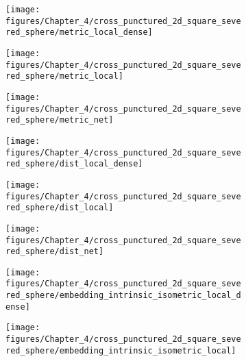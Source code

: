 	\begin{figure}[h]
		\begin{centering}
			\begin{subfigure}[b]{0.32\linewidth}
					\texttt{[image: figures/Chapter\_4/cross\_punctured\_2d\_square\_severed\_sphere/metric\_local\_dense]}
					\caption{\label{fig:1a}}
			\end{subfigure}\hfill
			\begin{subfigure}[b]{0.32\linewidth}
					\texttt{[image: figures/Chapter\_4/cross\_punctured\_2d\_square\_severed\_sphere/metric\_local]}
					\caption{\label{fig:1b}}
			\end{subfigure}\hfill
			\begin{subfigure}[b]{0.32\linewidth}
					\texttt{[image: figures/Chapter\_4/cross\_punctured\_2d\_square\_severed\_sphere/metric\_net]}
					\caption{\label{fig:1c}}
			\end{subfigure}
		\end{centering}
		\begin{centering}
			\begin{subfigure}[b]{0.32\linewidth}
					\texttt{[image: figures/Chapter\_4/cross\_punctured\_2d\_square\_severed\_sphere/dist\_local\_dense]}
					\caption{\label{fig:1d}}
			\end{subfigure}\hfill
			\begin{subfigure}[b]{0.32\linewidth}
					\texttt{[image: figures/Chapter\_4/cross\_punctured\_2d\_square\_severed\_sphere/dist\_local]}
					\caption{\label{fig:1e}}
			\end{subfigure}\hfill
			\begin{subfigure}[b]{0.32\linewidth}
					\texttt{[image: figures/Chapter\_4/cross\_punctured\_2d\_square\_severed\_sphere/dist\_net]}
					\caption{\label{fig:1f}}
			\end{subfigure}
		\end{centering}
		\begin{centering}
			\begin{subfigure}[b]{0.32\linewidth}
					\texttt{[image: figures/Chapter\_4/cross\_punctured\_2d\_square\_severed\_sphere/embedding\_intrinsic\_isometric\_local\_dense]}
					\caption{\label{fig:1g}}
			\end{subfigure}\hfill
			\begin{subfigure}[b]{0.32\linewidth}
					\texttt{[image: figures/Chapter\_4/cross\_punctured\_2d\_square\_severed\_sphere/embedding\_intrinsic\_isometric\_local]}

\end{subfigure}
\end{centering}
\end{figure}
